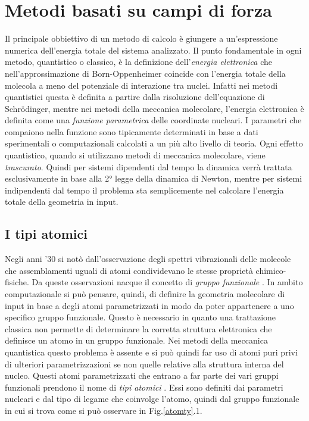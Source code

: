 \documentclass[oneside]{amsbook}
\numberwithin{section}{chapter}
\numberwithin{equation}{section}
\numberwithin{figure}{section}
\begin{document}
\chapter{Metodi basati su campi di forza}
Il principale obbiettivo di un metodo di calcolo è giungere a un'espressione numerica dell'energia totale del sistema analizzato. Il punto fondamentale in ogni metodo, quantistico o classico, è la definizione dell'\emph{energia elettronica} che nell'approssimazione di Born-Oppenheimer coincide con l'energia totale della molecola a meno del potenziale di interazione tra nuclei. Infatti nei metodi quantistici questa è definita a partire dalla risoluzione dell'equazione di Schr\"{o}dinger, mentre nei metodi della meccanica molecolare, l'energia elettronica è definita come una \emph{funzione parametrica} delle coordinate nucleari. I parametri che compaiono nella funzione sono tipicamente determinati in base a  dati sperimentali o computazionali calcolati a un più alto livello di teoria.
Ogni effetto quantistico, quando si utilizzano metodi di meccanica molecolare, viene \emph{trascurato}. Quindi per sistemi dipendenti dal tempo la dinamica verrà trattata esclusivamente in base alla 2° legge della dinamica di Newton, mentre per sistemi indipendenti dal tempo il problema sta semplicemente nel calcolare l'energia totale della geometria in input.
\section{I tipi atomici}
Negli anni '30 si notò dall'osservazione degli spettri vibrazionali delle molecole che assemblamenti uguali di atomi condividevano le stesse proprietà chimico-fisiche. Da queste osservazioni nacque il concetto di \emph{gruppo funzionale} . In ambito computazionale si può pensare, quindi, di definire la geometria molecolare di input in base a degli atomi parametrizzati in modo da poter appartenere a uno specifico gruppo funzionale. Questo è necessario in quanto una trattazione classica non permette di determinare la corretta struttura elettronica che definisce un atomo in un gruppo funzionale. Nei metodi della meccanica quantistica questo problema è assente e si può quindi far uso di atomi puri privi di ulteriori parametrizzazioni se non quelle relative alla struttura interna del nucleo.
Questi atomi parametrizzati che entrano a far parte dei vari gruppi funzionali prendono il nome di \emph{tipi atomici} . Essi sono definiti dai parametri nucleari e dal tipo di legame che coinvolge l'atomo, quindi dal gruppo funzionale in cui si trova come si può osservare in Fig.\ref{atomty}.1.
\end{document}
